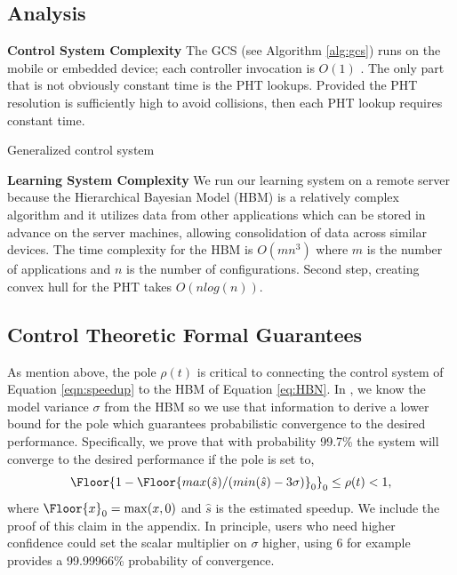 \subsection{Analysis}

\noindent \textbf{Control System Complexity} The GCS (see Algorithm
\ref{alg:gcs}) runs on the mobile or embedded device; each controller
invocation is $O(1)$ .  The only part that is not obviously constant
time is the PHT lookups.  Provided the PHT resolution is sufficiently
high to avoid collisions, then each PHT lookup requires constant time.
\begin{algorithm}[t]
\caption{Generalized control system}
\label{alg:gcs}
\end{algorithm}


\noindent \textbf{Learning System Complexity} We run our learning
system on a remote server because the Hierarchical Bayesian Model
(HBM) is a relatively complex algorithm and it utilizes data from
other applications which can be stored in advance on the server
machines, allowing consolidation of data across similar devices.  The
time complexity for the HBM is $O(mn^3)$ where $m$ is the number of
applications and $n$ is the number of configurations.  Second step,
creating convex hull for the PHT takes $O(n log(n))$.

\subsection{Control Theoretic Formal Guarantees}
\label{sec:guarantees}
As mention above, the pole $\rho(t)$ is critical to connecting the control
system of Equation \ref{eqn:speedup} to the HBM of Equation
\ref{eq:HBN}.  In \SYSTEM{}, we know the model variance $\sigma$ from
the HBM so we use that information to derive a lower bound for the
pole which guarantees probabilistic convergence to the desired
performance. Specifically, we prove that with probability 99.7\% the
system will converge to the desired performance if the pole is set to,
$$\Floor{1- \Floor{max(\hat{s})/(min(\hat{s}) - 3\sigma)}_0}_0 \leq \rho(t)
< 1,$$ where $\Floor{x}_0 = \max(x,0)$ and $\hat{s}$ is the
estimated speedup. We include the proof of this claim in the appendix. In principle, users who need higher confidence
could set the scalar multiplier on $\sigma$ higher, using $6$ for
example provides a 99.99966\% probability of convergence.  

